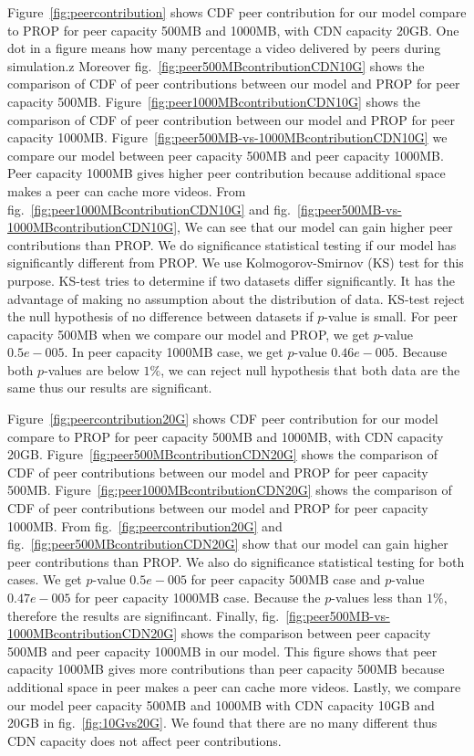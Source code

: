 \documentclass[10pt,final,journal,a4paper]{IEEEtran}
\begin{document}
Figure~\ref{fig:peercontribution} shows CDF peer contribution for our model compare to PROP for peer capacity 500MB and 1000MB, with CDN capacity 20GB. 
One dot in a figure means how many percentage a video delivered by peers during simulation.z
Moreover fig.~\ref{fig:peer500MBcontributionCDN10G} shows the comparison of CDF of peer contributions between our model and PROP for peer capacity 500MB. 
Figure~\ref{fig:peer1000MBcontributionCDN10G} shows the comparison of CDF of peer contribution between our model and PROP for peer capacity 1000MB.
Figure~\ref{fig:peer500MB-vs-1000MBcontributionCDN10G} we compare our model between peer capacity 500MB and peer capacity 1000MB.
Peer capacity 1000MB gives higher peer contribution because additional space makes a peer can cache more videos.
From fig.~\ref{fig:peer1000MBcontributionCDN10G} and fig.~\ref{fig:peer500MB-vs-1000MBcontributionCDN10G}, We can see that our model can gain higher peer contributions than PROP.
We do significance statistical testing if our model has significantly different from PROP.
We use Kolmogorov-Smirnov (KS) test for this purpose.  
KS-test tries to determine if two datasets differ significantly.
It has the advantage of making no assumption about the distribution of data. 
KS-test reject the null hypothesis of no difference between datasets if $p$-value is small.
For peer capacity 500MB when we compare our model and PROP, we get $p$-value $0.5e-005$.
In peer capacity 1000MB case, we get $p$-value $0.46e-005$.
Because both $p$-values are below $1\%$, we can reject null hypothesis that both data are the same thus our results are significant.


Figure~\ref{fig:peercontribution20G} shows CDF peer contribution for our model compare to PROP for peer capacity 500MB and 1000MB, with CDN capacity 20GB.
Figure~\ref{fig:peer500MBcontributionCDN20G} shows the comparison of CDF of peer contributions between our model and PROP for peer capacity 500MB.
Figure~\ref{fig:peer1000MBcontributionCDN20G} shows the comparison of CDF of peer contributions between our model and PROP for peer capacity 1000MB.
From fig.~\ref{fig:peercontribution20G} and fig.~\ref{fig:peer500MBcontributionCDN20G} show that our model can gain higher peer contributions than PROP.
We also do significance statistical testing for both cases.  
We get $p$-value $0.5e-005$ for peer capacity 500MB case and $p$-value $0.47e-005$ for peer capacity 1000MB case.
Because the $p$-values less than $1\%$, therefore the results are signifincant.
Finally, fig.~\ref{fig:peer500MB-vs-1000MBcontributionCDN20G} shows the comparison between peer capacity 500MB and peer capacity 1000MB in our model. 
This figure shows that peer capacity 1000MB gives more contributions than peer capacity 500MB because additional space in peer makes a peer can cache more videos.  
Lastly, we compare our model peer capacity 500MB and 1000MB with CDN capacity 10GB and 20GB in fig.~\ref{fig:10Gvs20G}.
We found that there are no many different thus CDN capacity does not affect peer contributions. 
\end{document}
